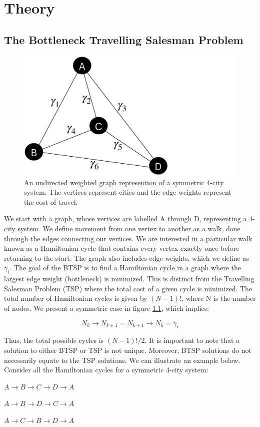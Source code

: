 \documentclass[msc,oneside]{ubcthesis}
\begin{document}
	\chapter{Theory}
	\section{The Bottleneck Travelling Salesman Problem}


\begin{figure}[!h]
	\centering
	\includegraphics[trim={0 0 21.9cm 0},clip, width=0.4 \linewidth]{"graphics/4-city"}
	\caption{An undirected weighted graph represention of a  symmetric 4-city system.  The vertices represent cities and the edge weights represent the cost of travel. }
	\label{fig:4-city-graphic}
\end{figure}		

We start with a graph, whose vertices are labelled A through D, representing a 4-city system. We define movement from one vertex to another as a walk, done through the edges connecting our vertices. We are interested in a particular walk known as a Hamiltonian cycle that contains every vertex exactly once before returning to the start. The graph also includes edge weights, which we define as $ \gamma_i $.
The goal of the BTSP is to find a Hamiltonian cycle in a graph where the largest edge weight (bottleneck) is minimized. This is distinct from the Travelling Salesman Problem (TSP) where the total cost of a given cycle is minimized. The total number of Hamiltonian cycles is given by $(N-1)!$, where N is the number of nodes. We present a symmetric case in figure \ref{fig:4-city-graphic}, which implies:

 $$N_k \rightarrow N_{k+1} = N_{k+1} \rightarrow N_{k} = \gamma_i$$
 
 Thus, the total possible cycles is  $(N-1)!/2$.  It is important to note that a solution to either BTSP or TSP is not unique. Moreover, BTSP solutions do not necessarily equate to the TSP solutions. We can illustrate an example below. Consider all the Hamiltonian cycles for a symmetric 4-city system:

\begin{center}
	$ A \rightarrow B \rightarrow C \rightarrow D \rightarrow A $
	
	$ A \rightarrow B \rightarrow D \rightarrow C \rightarrow A $ 
	
	$ A \rightarrow C \rightarrow B \rightarrow D \rightarrow A $
\end{center}
\end{document}
